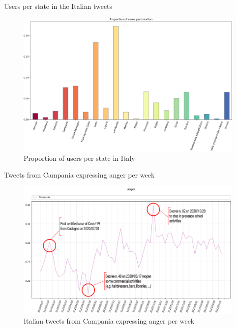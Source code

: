 \documentclass[8pt]{beamer}  %
\begin{document}
\begin{frame}{Users per state in the Italian tweets}
    
    \begin{figure}[H]
	\centering
    	\includegraphics[scale=.25]{assets/img/it_users_per_state.svg.pdf}
    	\caption{Proportion of users per state in Italy}
    	\label{fig:it-users-state}
\end{figure}
    
\end{frame}

\begin{frame}{Tweets from Campania expressing anger per week}
    
    \begin{figure}[H]
        \centering
        \includegraphics[scale=0.3]{assets/img/it_Campania_anger_with_events.png}
        \caption{Italian tweets from Campania expressing anger per week}
        \label{fig:it_Campania_anger}
    \end{figure}
    
\end{frame}
\end{document}
